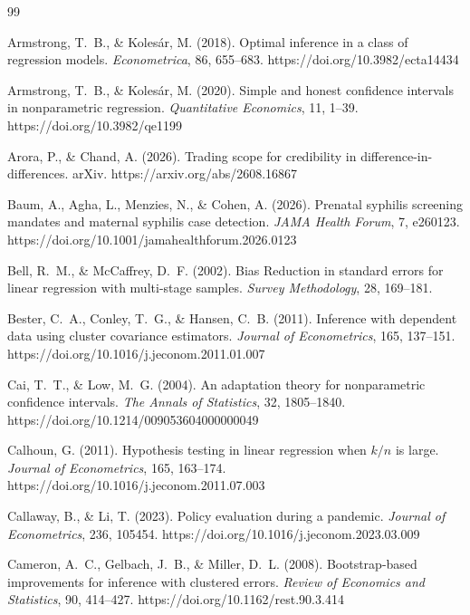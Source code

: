 \documentclass[12pt]{article}
\theoremstyle{definition}
\numberwithin{equation}{section}
\begin{document}
\begin{thebibliography}{99}

 Armstrong, T.~B., \& Koles\'ar, M. (2018). Optimal inference in a class of regression models. \emph{Econometrica}, 86, 655--683. https://doi.org/10.3982/ecta14434

 Armstrong, T.~B., \& Koles\'ar, M. (2020). Simple and honest confidence intervals in nonparametric regression. \emph{Quantitative Economics}, 11, 1--39. https://doi.org/10.3982/qe1199

 Arora, P., \& Chand, A. (2026). Trading scope for credibility in difference-in-differences. arXiv. https://arxiv.org/abs/2608.16867

 Baum, A., Agha, L., Menzies, N., \& Cohen, A. (2026). Prenatal syphilis screening mandates and maternal syphilis case detection. \emph{JAMA Health Forum}, 7, e260123. https://doi.org/10.1001/jamahealthforum.2026.0123

 Bell, R.~M., \& McCaffrey, D.~F. (2002). Bias Reduction in standard errors for linear regression with multi-stage samples. \emph{Survey Methodology}, 28, 169--181.

 Bester, C.~A., Conley, T.~G., \& Hansen, C.~B. (2011). Inference with dependent data using cluster covariance estimators. \emph{Journal of Econometrics}, 165, 137--151. https://doi.org/10.1016/j.jeconom.2011.01.007

 Cai, T.~T., \& Low, M.~G. (2004). An adaptation theory for nonparametric confidence intervals. \emph{The Annals of Statistics}, 32, 1805--1840. https://doi.org/10.1214/009053604000000049

 Calhoun, G. (2011). Hypothesis testing in linear regression when $k/n$ is large. \emph{Journal of Econometrics}, 165, 163--174. https://doi.org/10.1016/j.jeconom.2011.07.003

 Callaway, B., \& Li, T. (2023). Policy evaluation during a pandemic. \emph{Journal of Econometrics}, 236, 105454. https://doi.org/10.1016/j.jeconom.2023.03.009

 Cameron, A.~C., Gelbach, J.~B., \& Miller, D.~L. (2008). Bootstrap-based improvements for inference with clustered errors. \emph{Review of Economics and Statistics}, 90, 414--427. https://doi.org/10.1162/rest.90.3.414


\end{thebibliography}
\end{document}
